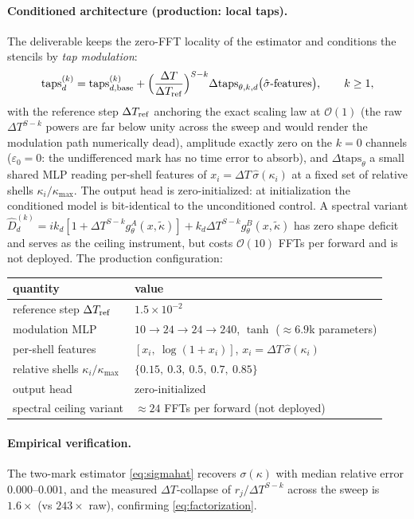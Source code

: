 \documentclass[11pt]{article}
\theoremstyle{plain}
\theoremstyle{definition}
\newcommand{\bO}{\mathcal{O}}
\newcommand{\DT}{\Delta T}
\newcommand{\shat}{\hat{\sigma}}
\begin{document}
\paragraph{Conditioned architecture (production: local taps).}
The deliverable keeps the zero-FFT locality of the estimator and conditions
the stencils by \emph{tap modulation}:
\begin{equation}
\mathrm{taps}^{(k)}_d
=\mathrm{taps}^{(k)}_{d,\rm base}
+\Big(\frac{\DT}{\DT_{\rm ref}}\Big)^{S-k}
\Delta\mathrm{taps}_{\theta,k,d}\big(\shat\text{-features}\big),
\qquad k\ge1,
\label{eq:condlocal}
\end{equation}
with the reference step $\DT_{\rm ref}$ anchoring the exact scaling law at
$\bO(1)$ (the raw $\DT^{S-k}$ powers are far below unity across the sweep
and would render the modulation path numerically dead), amplitude exactly
zero on the $k=0$ channels ($\varepsilon_0=0$: the undifferenced mark has no
time error to absorb), and $\Delta\mathrm{taps}_\theta$ a small shared MLP
reading per-shell features of $x_i=\DT\,\shat(\kappa_i)$ at a fixed set of
relative shells $\kappa_i/\kappa_{\max}$. The output head is
zero-initialized: at initialization the conditioned model is bit-identical
to the unconditioned control. A spectral variant
$\hat D^{(k)}_d=ik_d[1+\DT^{S-k}g^A_\theta(x,\tilde\kappa)]
+k_d\DT^{S-k}g^B_\theta(x,\tilde\kappa)$ has zero shape deficit and serves
as the ceiling instrument, but costs $\bO(10)$ FFTs per forward and is not
deployed. The production configuration:
\begin{center}\small
\begin{tabular}{ll}
\toprule
quantity & value\\
\midrule
reference step $\DT_{\rm ref}$ & $1.5\times10^{-2}$\\
modulation MLP & $10\to24\to24\to240$, $\tanh$ ($\approx6.9$k parameters)\\
per-shell features & $[x_i,\ \log(1{+}x_i)]$, $x_i=\DT\,\shat(\kappa_i)$\\
relative shells $\kappa_i/\kappa_{\max}$ & $\{0.15,\ 0.3,\ 0.5,\ 0.7,\ 0.85\}$\\
output head & zero-initialized\\
spectral ceiling variant & $\approx24$ FFTs per forward (not deployed)\\
\bottomrule
\end{tabular}
\end{center}

\paragraph{Empirical verification.}
The two-mark estimator \eqref{eq:sigmahat} recovers $\sigma(\kappa)$ with
median relative error $0.000$--$0.001$, and the measured $\DT$-collapse of
$r_j/\DT^{S-k}$ across the sweep is $1.6\times$ (vs $243\times$ raw),
confirming \eqref{eq:factorization}.
\end{document}
